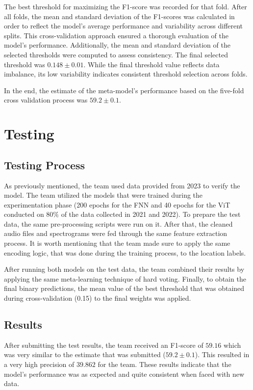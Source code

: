 \documentclass[12pt, conference]{IEEEtran}
\begin{document}
The best threshold for maximizing the F1-score was recorded for that fold. After all folds, the mean and standard deviation of the F1-scores was calculated in order to reflect the model's average performance and variability across different splits. This cross-validation approach ensured a thorough evaluation of the model’s performance. Additionally, the mean and standard deviation of the selected thresholds were computed to assess consistency. The final selected threshold was $0.148 \pm 0.01$. While the final threshold value reflects data imbalance, its low variability indicates consistent threshold selection across folds.

In the end, the estimate of the meta-model's performance based on the five-fold cross validation process was $59.2 \pm 0.1$. 

\section{Testing}
\subsection{Testing Process}
As previously mentioned, the team used data provided from 2023 to verify the model. The team utilized the models that were trained during the experimentation phase (200 epochs for the FNN and 40 epochs for the ViT conducted on $80\%$ of the data collected in 2021 and 2022). To prepare the test data, the same pre-processing scripts were run on it. After that, the cleaned audio files and spectrograms were fed through the same feature extraction process. It is worth mentioning that the team made sure to apply the same encoding logic, that was done during the training process, to the location labels. 

After running both models on the test data, the team combined their results by applying the same meta-learning technique of hard voting. Finally, to obtain the final binary predictions, the mean value of the best threshold that was obtained during cross-validation (0.15) to the final weights was applied. 

\subsection{Results}
After submitting the test results, the team received an F1-score of $59.16$ which was very similar to the estimate that was submitted ($59.2 \pm 0.1$). This resulted in a very high precision of $39.862$ for the team. These results indicate that the model's performance was as expected and quite consistent when faced with new data.
\end{document}
